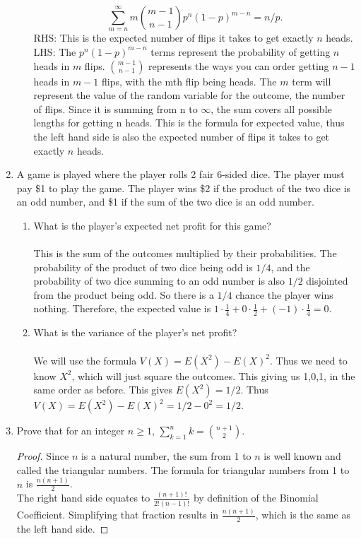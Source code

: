 \documentclass[12pt]{article}
\begin{document}
\begin{enumerate}
\begin{enumerate}
\[\sum_{m=n}^\infty m {m-1 \choose n-1} p^{n} (1-p)^{m-n} = n/p.\]
RHS: This is the expected number of flips it takes to get exactly $n$ heads.\\
LHS: The $p^{n} (1-p)^{m-n}$ terms represent the probability of getting $n$ heads in $m$ flips. ${m-1 \choose n-1}$ represents the ways you can order getting $n-1$ heads in $m-1$ flips, with the mth flip being heads. The $m$ term will represent the value of the random variable for the outcome, the number of flips. Since it is summing from n to $\infty$, the sum covers all possible lengths for getting n heads. This is the formula for expected value, thus the left hand side is also the expected number of flips it takes to get exactly $n$ heads.
\end{enumerate}


\medskip
\item A game is played where the player rolls 2 fair 6-sided dice. The player must pay \$1 to play the game. The player wins \$2 if the product of the two dice is an odd number, and \$1 if the sum of the two dice is an odd number.

\begin{enumerate}
\item What is the player's expected net profit for this game?\\\\
This is the sum of the outcomes multiplied by their probabilities. The probability of the product of two dice being odd is $1/4$, and the probability of two dice summing to an odd number is also $1/2$ disjointed from the product being odd. So there is a $1/4$ chance the player wins nothing. Therefore, the expected value is $1\cdot\frac{1}{4}+0\cdot\frac{1}{2}+(-1)\cdot\frac{1}{4} = 0$.
\item What is the variance of the player's net profit?\\\\
We will use the formula $V(X) = E(X^2)-E(X)^2$. Thus we need to know $X^2$, which will just square the outcomes. This giving us 1,0,1, in the same order as before. This gives $E(X^2)=1/2$. Thus $V(X)=E(X^2)-E(X)^2=1/2-0^2=1/2$.
\end{enumerate}


\medskip

\item Prove that for an integer $n\geq 1$, $\sum_{k=1}^n k = {n+1 \choose 2}$.
\begin{proof}
	Since $n$ is a natural number, the sum from 1 to $n$ is well known and called the triangular numbers. The formula for triangular numbers from 1 to $n$ is $\frac{n(n+1)}{2}$.\\ 
	The right hand side equates to $\frac{(n+1)!}{2!(n-1)!}$ by definition of the Binomial Coefficient. Simplifying that fraction results in $\frac{n(n+1)}{2}$, which is the same as the left hand side.
\end{proof}


\end{enumerate}
\end{document}
